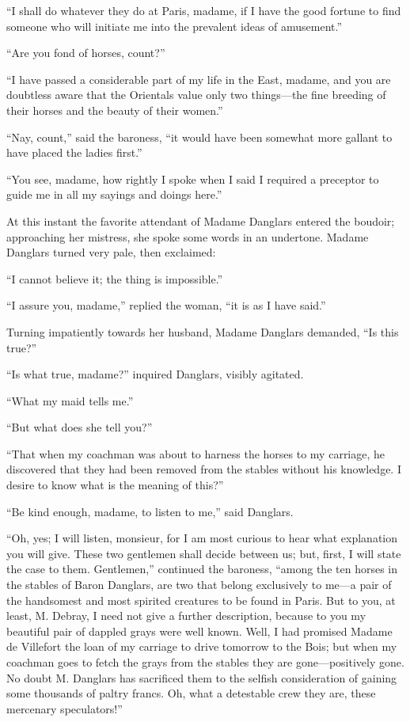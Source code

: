 “I shall do whatever they do at Paris, madame, if I have the good
fortune to find someone who will initiate me into the prevalent ideas
of amusement.”

“Are you fond of horses, count?”

“I have passed a considerable part of my life in the East, madame, and
you are doubtless aware that the Orientals value only two things—the
fine breeding of their horses and the beauty of their women.”

“Nay, count,” said the baroness, “it would have been somewhat more
gallant to have placed the ladies first.”

“You see, madame, how rightly I spoke when I said I required a
preceptor to guide me in all my sayings and doings here.”

At this instant the favorite attendant of Madame Danglars entered the
boudoir; approaching her mistress, she spoke some words in an
undertone. Madame Danglars turned very pale, then exclaimed:

“I cannot believe it; the thing is impossible.”

“I assure you, madame,” replied the woman, “it is as I have said.”

Turning impatiently towards her husband, Madame Danglars demanded, “Is
this true?”

“Is what true, madame?” inquired Danglars, visibly agitated.

“What my maid tells me.”

“But what does she tell you?”

“That when my coachman was about to harness the horses to my carriage,
he discovered that they had been removed from the stables without his
knowledge. I desire to know what is the meaning of this?”

“Be kind enough, madame, to listen to me,” said Danglars.

“Oh, yes; I will listen, monsieur, for I am most curious to hear what
explanation you will give. These two gentlemen shall decide between us;
but, first, I will state the case to them. Gentlemen,” continued the
baroness, “among the ten horses in the stables of Baron Danglars, are
two that belong exclusively to me—a pair of the handsomest and most
spirited creatures to be found in Paris. But to you, at least, M.
Debray, I need not give a further description, because to you my
beautiful pair of dappled grays were well known. Well, I had promised
Madame de Villefort the loan of my carriage to drive tomorrow to the
Bois; but when my coachman goes to fetch the grays from the stables
they are gone—positively gone. No doubt M. Danglars has sacrificed them
to the selfish consideration of gaining some thousands of paltry
francs. Oh, what a detestable crew they are, these mercenary
speculators!”

